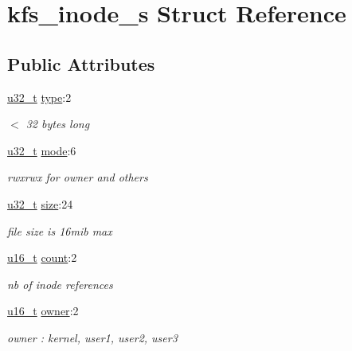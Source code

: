 \hypertarget{structkfs__inode__s}{\section{kfs\-\_\-inode\-\_\-s Struct Reference}
\label{structkfs__inode__s}
}
\subsection*{Public Attributes}
\begin{DoxyCompactItemize}
\item 
\hyperlink{kfs_8c_a0c0a490ab7fa397be6c764a935cc5ea4}{u32\-\_\-t} \hyperlink{structkfs__inode__s_ac894cd2c4c9d7e6409c3302d1edec307}{type}\-:2
\begin{DoxyCompactList}\small\item\em $<$ 32 bytes long \end{DoxyCompactList}\item 
\hyperlink{kfs_8c_a0c0a490ab7fa397be6c764a935cc5ea4}{u32\-\_\-t} \hyperlink{structkfs__inode__s_af0dd6151a1aba841d36f2d005e77aef4}{mode}\-:6
\begin{DoxyCompactList}\small\item\em rwxrwx for owner and others \end{DoxyCompactList}\item 
\hyperlink{kfs_8c_a0c0a490ab7fa397be6c764a935cc5ea4}{u32\-\_\-t} \hyperlink{structkfs__inode__s_ae4c3aa6d76cc8e92a9b29c2b3707f473}{size}\-:24
\begin{DoxyCompactList}\small\item\em file size is 16mib max \end{DoxyCompactList}\item 
\hyperlink{kfs_8c_afc6499c1f28697aa3bfc2804d496fd11}{u16\-\_\-t} \hyperlink{structkfs__inode__s_ae5ea15e9504973dc519f2ceca209a3d8}{count}\-:2
\begin{DoxyCompactList}\small\item\em nb of inode references \end{DoxyCompactList}\item 
\hyperlink{kfs_8c_afc6499c1f28697aa3bfc2804d496fd11}{u16\-\_\-t} \hyperlink{structkfs__inode__s_adecb12117172ae213c9d659ffbcd809b}{owner}\-:2
\begin{DoxyCompactList}\small\item\em owner \-: kernel, user1, user2, user3 \end{DoxyCompactList}\item 

\end{DoxyCompactItemize}
